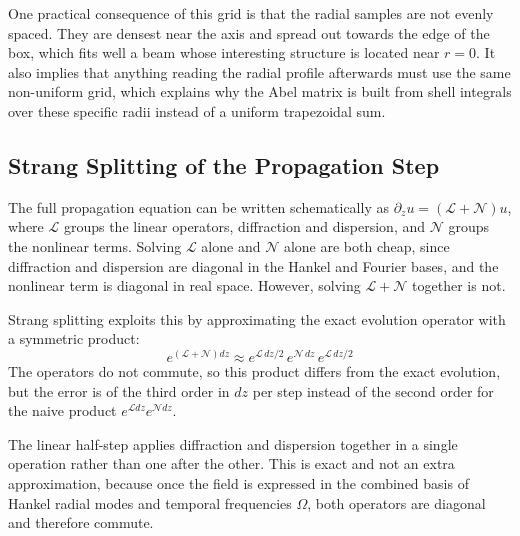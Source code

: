 One practical consequence of this grid is that the radial samples are not evenly spaced. They are densest near the axis and spread out towards the edge of the box, which fits well a beam whose interesting structure is located near $r=0$. It also implies that anything reading the radial profile afterwards must use the same non-uniform grid, which explains why the Abel matrix is built from shell integrals over these specific radii instead of a uniform trapezoidal sum.


\subsection{Strang Splitting of the Propagation Step}

The full propagation equation can be written schematically as $\partial_z u = (\mathcal{L}+\mathcal{N})u$, where $\mathcal{L}$ groups the linear operators, diffraction and dispersion, and $\mathcal{N}$ groups the nonlinear terms. Solving $\mathcal{L}$ alone and $\mathcal{N}$ alone are both cheap, since diffraction and dispersion are diagonal in the Hankel and Fourier bases, and the nonlinear term is diagonal in real space. However, solving $\mathcal{L}+\mathcal{N}$ together is not.

Strang splitting exploits this by approximating the exact evolution operator with a symmetric product:
\begin{equation}
e^{(\mathcal{L}+\mathcal{N})dz} \approx e^{\mathcal{L}\,dz/2}\,e^{\mathcal{N}\,dz}\,e^{\mathcal{L}\,dz/2}
\end{equation}
The operators do not commute, so this product differs from the exact evolution, but the error is of the third order in $dz$ per step instead of the second order for the naive product $e^{\mathcal{L}dz}e^{\mathcal{N}dz}$.

The linear half-step applies diffraction and dispersion together in a single operation rather than one after the other. This is exact and not an extra approximation, because once the field is expressed in the combined basis of Hankel radial modes and temporal frequencies $\Omega$, both operators are diagonal and therefore commute. 



